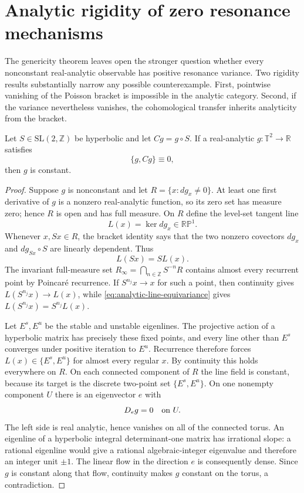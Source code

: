 \section{Analytic rigidity of zero resonance mechanisms}
\label{sec:analytic-resonance-rigidity}
The genericity theorem leaves open the stronger question whether every
nonconstant real-analytic observable has positive resonance variance.  Two
rigidity results substantially narrow any possible counterexample.  First,
pointwise vanishing of the Poisson bracket is impossible in the analytic
category.  Second, if the variance nevertheless vanishes, the cohomological
transfer inherits analyticity from the bracket.

\begin{theorem}
\label{thm:analytic-bracket-rigidity}
Let $S\in\mathrm{SL}(2,\mathbb Z)$ be hyperbolic and let
$Cg=g\circ S$.  If a real-analytic $g:\mathbb T^2\to\mathbb R$ satisfies
\[
 \{g,Cg\}\equiv0,
\]
then $g$ is constant.
\end{theorem}
\begin{proof}
Suppose $g$ is nonconstant and let
$R=\{x:dg_x\ne0\}$.  At least one first derivative of $g$ is a nonzero
real-analytic function, so its zero set has measure zero; hence $R$ is open
and has full measure.  On $R$ define the level-set tangent line
\[
 L(x)=\ker dg_x\in\mathbb{RP}^1.
\]
Whenever $x,Sx\in R$, the bracket identity says that the two nonzero
covectors $dg_x$ and $dg_{Sx}\circ S$ are linearly dependent.  Thus
\begin{equation}\label{eq:analytic-line-equivariance}
 L(Sx)=S L(x).
\end{equation}
The invariant full-measure set
$R_\infty=\bigcap_{n\in\mathbb Z}S^{-n}R$ contains almost every recurrent
point by Poincar\'e recurrence.  If $S^{n_j}x\to x$ for such a point, then
continuity gives $L(S^{n_j}x)\to L(x)$, while
\eqref{eq:analytic-line-equivariance} gives
$L(S^{n_j}x)=S^{n_j}L(x)$.

Let $E^s,E^u$ be the stable and unstable eigenlines.  The projective action
of a hyperbolic matrix has precisely these fixed points, and every line other
than $E^s$ converges under positive iteration to $E^u$.  Recurrence therefore
forces $L(x)\in\{E^s,E^u\}$ for almost every regular $x$.  By continuity this
holds everywhere on $R$.  On each connected component of $R$ the line field
is constant, because its target is the discrete two-point set
$\{E^s,E^u\}$.  On one nonempty component $U$ there is an eigenvector $e$
with
\[
 D_e g=0\quad\hbox{on }U.
\]
The left side is real analytic, hence vanishes on all of the connected torus.
An eigenline of a hyperbolic integral determinant-one matrix has irrational
slope: a rational eigenline would give a rational algebraic-integer
eigenvalue and therefore an integer unit $\pm1$.  The linear flow in the
direction $e$ is consequently dense.  Since $g$ is constant along that flow,
continuity makes $g$ constant on the torus, a contradiction.
\end{proof}

